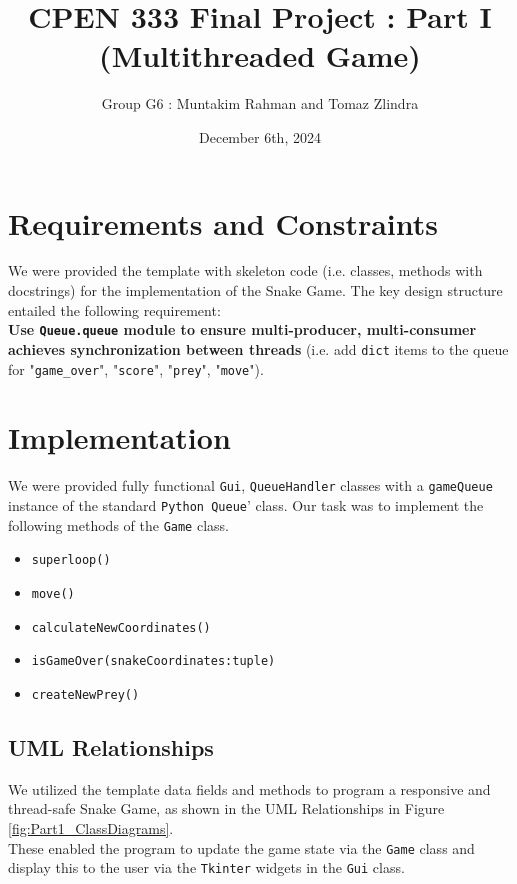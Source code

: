 \documentclass{article}
\title{CPEN 333 Final Project : Part I (Multithreaded Game)}
\author{Group G6 : Muntakim Rahman and Tomaz Zlindra}
\date{December 6th, 2024}
\begin{document}
\maketitle

\section{Requirements and Constraints}

We were provided the template with skeleton code (i.e. classes, methods with docstrings) for the implementation of the Snake Game.
The key design structure entailed the following requirement: \\

\textbf{Use \texttt{Queue.queue} module to ensure multi-producer, multi-consumer achieves synchronization between threads} (i.e. add \texttt{dict} items to the queue for "\texttt{game\_over}", "\texttt{score}", "\texttt{prey}", "\texttt{move}").

\section{Implementation}

We were provided fully functional \texttt{Gui}, \texttt{QueueHandler} classes with a \texttt{gameQueue} instance of the standard \texttt{Python Queue}' class.
Our task was to implement the following methods of the \texttt{Game} class.

\begin{itemize}
    \item \texttt{superloop()}
    \item \texttt{move()}
    \item \texttt{calculateNewCoordinates()}
    \item \texttt{isGameOver(snakeCoordinates:tuple)}
    \item \texttt{createNewPrey()}
\end{itemize}

\subsection{UML Relationships}

We utilized the template data fields and methods to program a responsive and thread-safe Snake Game, as shown in the UML Relationships in Figure \ref{fig:Part1_ClassDiagrams}. \\

These enabled the program to update the game state via the \texttt{Game} class and display this to the user via the \texttt{Tkinter} widgets in the \texttt{Gui} class.
\end{document}
